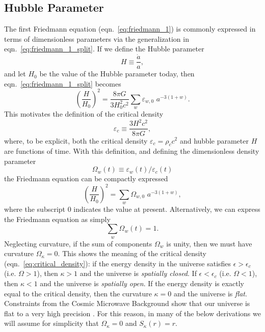\subsection{Hubble Parameter}
\label{sec:hubble_parameter}
The first Friedmann equation (eqn.~\ref{eq:friedmann_1}) is commonly expressed
in terms of dimensionless parameters via the generalization in
eqn.~\ref{eq:friedmann_1_split}.  If we define the Hubble parameter
\begin{equation}
  \label{eq:hubble_parameter}
  H \equiv \frac{\dot{a}}{a},
\end{equation}
and let $H_0$ be the value of the Hubble parameter today, then
eqn.~\ref{eq:friedmann_1_split} becomes
\begin{equation}
  \left(\frac{H}{H_0}\right)^2 = \frac{8\pi G}{3H_0^2c^2}
  \sum_w \varepsilon_{w, 0} \,\, a^{-3(1 + w)}.
\end{equation}
This motivates the definition of the critical density
\begin{equation}
  \label{eq:critical_density}
  \varepsilon_c \equiv \frac{3 H^2 c^2}{8\pi G},
\end{equation}
where, to be explicit, both the critical density $\varepsilon_c = \rho_c c^2$
and hubble parameter $H$ are functions of time.  With this definition,
and defining the dimensionless density parameter
\begin{equation}
  \label{eq:density_parameter}
  \Omega_w(t) \equiv \varepsilon_w(t) / \varepsilon_c(t)
\end{equation}
the Friedmann equation can be compactly expressed
\begin{equation}
  \left(\frac{H}{H_0}\right)^2
  = \sum_w \Omega_{w, 0}\,\, a^{-3(1 + w)},
\end{equation}
where the subscript $0$ indicates the value at present.
Alternatively, we can express the Friedmann equation as simply
\begin{equation}
  \sum_w \Omega_w(t) = 1.
\end{equation}
Neglecting curvature, if the sum of components $\Omega_w$ is unity, then
we must have curvature $\Omega_\kappa = 0$.  This shows the meaning of
the critical density (eqn.~\ref{eq:critical_density}): if the energy density
in the universe satisfies $\epsilon > \epsilon_c$ (i.e. $\Omega > 1$), then
$\kappa > 1$ and the universe is {\it spatially closed}.
If $\epsilon < \epsilon_c$ (i.e. $\Omega < 1$), then $\kappa < 1$ and
the universe is {\it spatially open}. If the energy density is
exactly equal to the critical density, then the curvature $\kappa = 0$
and the universe is {\it flat}.  Constraints from the Cosmic Microwave
Background show that our universe is flat to a very high precision
\citep{WMAP7}.  For this reason, in many of the below derivations we will
assume for simplicity that $\Omega_\kappa = 0$ and $S_\kappa(r) = r$.

